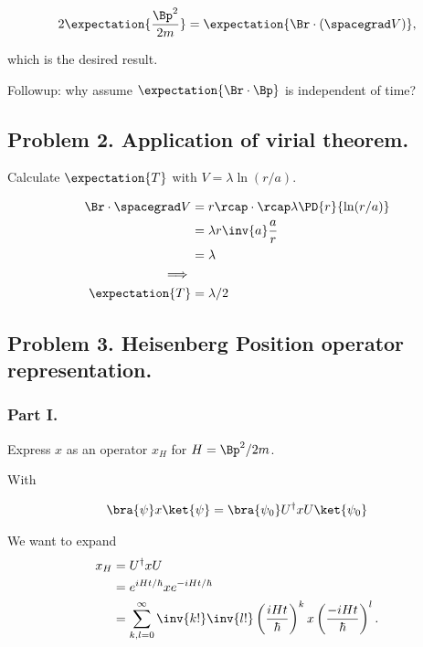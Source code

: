 \begin{align}\label{eqn:desaiCh3:104}
2 \expectation{ \frac{\Bp^2}{2m} } = \expectation{ \Br \cdot (\spacegrad V) },
\end{align}

which is the desired result.

Followup: why assume $\expectation{\Br \cdot \Bp}$ is independent of time?



\subsection{Problem 2. Application of virial theorem.}

Calculate $\expectation{T}$ with $V = \lambda \ln(r/a)$.

\begin{align*}
\Br \cdot \spacegrad V 
&= r \rcap \cdot \rcap \lambda \PD{r}{\ln(r/a)} \\
&= \lambda r \inv{a} \frac{a}{r} \\
&= \lambda  \\
\implies \\
\expectation{T} &= \lambda/2
\end{align*}

\subsection{Problem 3. Heisenberg Position operator representation.}

\subsubsection{Part I.}
Express $x$ as an operator $x_H$ for $H = \Bp^2/2m$.

With 

\begin{align*}
\bra{\psi} x \ket{\psi} = \bra{\psi_0} U^\dagger x U \ket{\psi_0}
\end{align*}

We want to expand 
\begin{align*}
x_H 
&= U^\dagger x U \\
&= e^{i H t/\hbar} x e^{-iH t/\hbar} \\
&= \sum_{k,l = 0}^\infty \inv{k!} \inv{l!} 
\left(\frac{i H t}{\hbar}\right)^k 
x 
\left(\frac{-i H t}{\hbar}\right)^l .
\end{align*}

